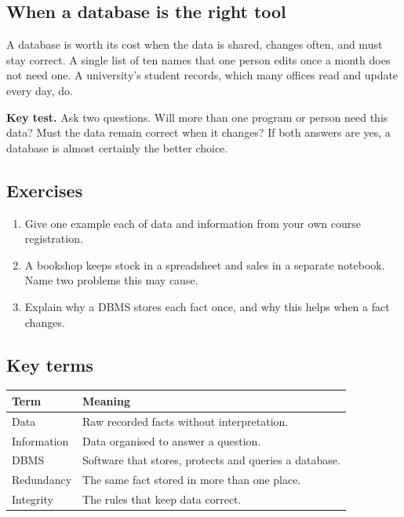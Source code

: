 \subsection{When a database is the right tool}

A database is worth its cost when the data is shared, changes often, and must stay correct. A single list of ten names that one person edits once a month does not need one. A university's student records, which many offices read and update every day, do.

\begin{keytest}
\textbf{Key test.} Ask two questions. Will more than one program or person need this data? Must the data remain correct when it changes? If both answers are yes, a database is almost certainly the better choice.
\end{keytest}

\subsection{Exercises}

\begin{enumerate}
  \item Give one example each of data and information from your own course registration.
  \item A bookshop keeps stock in a spreadsheet and sales in a separate notebook. Name two problems this may cause.
  \item Explain why a DBMS stores each fact once, and why this helps when a fact changes.
\end{enumerate}

\subsection{Key terms}

\begin{tabular}{@{}p{3.6cm}p{10.4cm}@{}}
\toprule
\textbf{Term} & \textbf{Meaning} \\
\midrule
Data & Raw recorded facts without interpretation. \\
Information & Data organised to answer a question. \\
DBMS & Software that stores, protects and queries a database. \\
Redundancy & The same fact stored in more than one place. \\
Integrity & The rules that keep data correct. \\
\bottomrule
\end{tabular}
